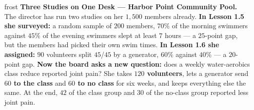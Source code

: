 \documentclass[10pt]{article}
\begin{document}

\vspace{0.15in}

\begin{headlinebox}{frost}
\small
\textbf{Three Studies on One Desk --- Harbor Point Community Pool.} The director
has run two studies on her $1{,}500$ members already. \textbf{In Lesson 1.5 she
surveyed:} a random sample of $200$ members, $70\%$ of the morning swimmers
against $45\%$ of the evening swimmers slept at least $7$ hours --- a $25$-point
gap, but the members had picked their own swim times. \textbf{In Lesson 1.6 she
assigned:} $90$ volunteers split $45$/$45$ by a generator, $60\%$ against
$40\%$ --- a $20$-point gap. \textbf{Now the board asks a new question:} does a
weekly water-aerobics class reduce reported joint pain? She takes
\textbf{$120$ volunteers}, lets a generator send \textbf{$60$ to the class} and
\textbf{$60$ to no class} for six weeks, and keeps everything else the same. At
the end, \textbf{$42$} of the class group and \textbf{$30$} of the no-class
group reported less joint pain.
\end{headlinebox}

\vspace{0.03in}
\end{document}
